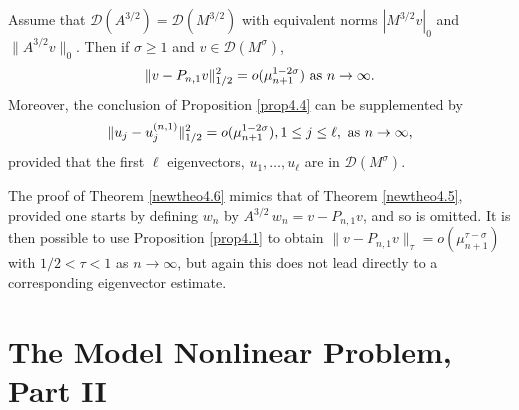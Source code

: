 \documentclass[final]{siamltex}
\numberwithin{equation}{section}
\begin{document}
\begin{theorem} \label{newtheo4.6}
Assume that $\mathcal{D}(A^{3/2})=\mathcal{D}(M^{3/2})$ with equivalent norms $|M^{3/2} v|_0$ and $\|A^{3/2} v\|_0$. Then if $\sigma \ge 1$ and $v \in \mathcal{D}(M^{\sigma})$,
\begin{equation} \notag
\|v- P_{n,1} v\|_{1/2}^2 =o(\mu_{n+1}^{1-2\sigma}) \text{ as } n\to \infty.
\end{equation}
Moreover, the conclusion of Proposition \ref{prop4.4} can be supplemented by
\begin{equation} \notag
\|u_j- u_j^{(n,1)}\|_{1/2}^2 =o(\mu_{n+1}^{1-2\sigma}), 1\le j \le \ell, \text{ as } n\to \infty,
\end{equation}
provided that the first $\ell$ eigenvectors, $u_1, \ldots, u_{\ell}$ are in $\mathcal{D}(M^{\sigma})$.
\end{theorem}

The proof of Theorem \ref{newtheo4.6} mimics that of Theorem \ref{newtheo4.5}, provided one starts by defining $w_n$ by $A^{3/2} \, w_n = v- P_{n,1} v$, and so is omitted. It is then possible to use Proposition \ref{prop4.1} to obtain $\|v - P_{n,1} v\|_{\tau} = o(\mu_{n+1}^{\tau-\sigma})$ with $1/2<\tau<1$ as $n \to \infty$, but again this does not lead directly to a corresponding eigenvector estimate.

\section{The Model Nonlinear Problem, Part II} \label{string}
\end{document}
